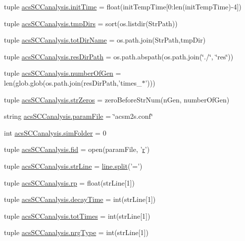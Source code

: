 \begin{DoxyCompactItemize}
\item 
tuple \hyperlink{a00096_a826c1b0585b4e8474c76f92bd7583836}{acs\-S\-C\-Canalysis.\-init\-Time} = float(init\-Temp\-Time\mbox{[}0\-:len(init\-Temp\-Time)-\/4\mbox{]})
\item 
tuple \hyperlink{a00096_ace4c571efd2e5ecd266ce5701f761a83}{acs\-S\-C\-Canalysis.\-tmp\-Dirs} = sort(os.\-listdir(Str\-Path))
\item 
tuple \hyperlink{a00096_a5903034df3d32525785e697152efbeb3}{acs\-S\-C\-Canalysis.\-tot\-Dir\-Name} = os.\-path.\-join(Str\-Path,tmp\-Dir)
\item 
tuple \hyperlink{a00096_a9ededb3cd7c63befde39ad68e5f9e006}{acs\-S\-C\-Canalysis.\-res\-Dir\-Path} = os.\-path.\-abspath(os.\-path.\-join(\char`\"{}./\char`\"{}, \char`\"{}res\char`\"{}))
\item 
tuple \hyperlink{a00096_a9a81829f850e2e125e3c94214da7a1f0}{acs\-S\-C\-Canalysis.\-number\-Of\-Gen} = len(glob.\-glob(os.\-path.\-join(res\-Dir\-Path,'times\-\_\-$\ast$')))
\item 
tuple \hyperlink{a00096_a8ba6aefb71b3d1e575eac38627f143d6}{acs\-S\-C\-Canalysis.\-str\-Zeros} = zero\-Before\-Str\-Num(n\-Gen, number\-Of\-Gen)
\item 
string \hyperlink{a00096_a7160f8e48b4aafebbd75e9037fc9fef7}{acs\-S\-C\-Canalysis.\-param\-File} = \char`\"{}acsm2s.\-conf\char`\"{}
\item 
int \hyperlink{a00096_a58095f64afeda893517e81226e1963c3}{acs\-S\-C\-Canalysis.\-sim\-Folder} = 0
\item 
tuple \hyperlink{a00096_a424e2204e89264a827e6cad861ebcbc1}{acs\-S\-C\-Canalysis.\-fid} = open(param\-File, '\hyperlink{a00025_ac862e7284527eb913b1351c8bfb8e079}{r}')
\item 
tuple \hyperlink{a00096_a072631e11db72789389935b0f9efff8d}{acs\-S\-C\-Canalysis.\-str\-Line} = \hyperlink{a00070_a4d1aa74fac80ae0275c056575fdb6626}{line.\-split}('=')
\item 
tuple \hyperlink{a00096_a98150f532e09ebae495212500d2f1799}{acs\-S\-C\-Canalysis.\-rp} = float(str\-Line\mbox{[}1\mbox{]})
\item 
tuple \hyperlink{a00096_a80a6d3cf3f4ccdc596054300761972a9}{acs\-S\-C\-Canalysis.\-decay\-Time} = int(str\-Line\mbox{[}1\mbox{]})
\item 
tuple \hyperlink{a00096_a20df40e09bc9514382d71f15783c7856}{acs\-S\-C\-Canalysis.\-tot\-Times} = int(str\-Line\mbox{[}1\mbox{]})
\item 
tuple \hyperlink{a00096_a0d0c83fd90489be59b1f5a31dadf4469}{acs\-S\-C\-Canalysis.\-nrg\-Type} = int(str\-Line\mbox{[}1\mbox{]})

\end{DoxyCompactItemize}
